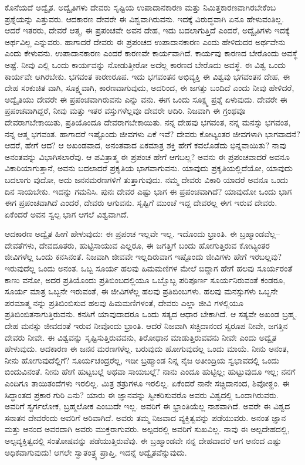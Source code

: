 ಕೊನೆಯದೆ ಅದ್ವೈತ. ಅದ್ವೈತಿಗಳು ದೇವರು ಸೃಷ್ಟಿಯ ಉಪಾದಾನಕಾರಣ ಮತ್ತು ನಿಮಿತ್ತಕಾರಣವಾಗಿರಬೇಕೆಂಬ ಪ್ರಶ್ನೆಯನ್ನು ಎತ್ತುವರು. ಆದಕಾರಣ ದೇವರೇ ಈ ವಿಶ್ವವಾಗಿರುವನು. ಇದಕ್ಕೆ ವಿರುದ್ಧವಾಗಿ ಏನೂ ಹೇಳುವಂತಿಲ್ಲ. ಆದರೆ ಇತರರು, ದೇವರೆ ಆತ್ಮ, ಈ ಪ್ರಪಂಚವೇ ಅವನ ದೇಹ, ಇದು ಬದಲಾಗುತ್ತಿದೆ ಎಂದರೆ, ಅದ್ವೈತಿಗಳು ಇದಕ್ಕೆ ಅರ್ಥವಿಲ್ಲ ಎನ್ನುವರು. ಹಾಗಾದರೆ ದೇವರು ಈ ಪ್ರಪಂಚದ ಉಪಾದಾನಕಾರಣ ಎಂದು ಹೇಳಿದುದರ ಅರ್ಥವೇನು ಎಂದು ಕೇಳುವನು. ಉಪಾದಾನಕಾರಣ ಎಂದರೆ ಕಾರಣವೇ ಕಾರ್ಯವಾಗಿದೆ. ಕಾರ್ಯವು ಕಾರಣದ ಬೇರೊಂದು ಅವಸ್ಥೆ ಅಷ್ಟೆ. ನೀವು ಎಲ್ಲಿ ಒಂದು ಕಾರ್ಯವನ್ನು ನೋಡುತ್ತೀರೋ ಅದೆಲ್ಲ ಕಾರಣದ ಬೇರೊದು ಅವಸ್ಥೆ. ಈ ವಿಶ್ವ ಒಂದು ಕಾರ್ಯವೇ ಆಗಿರಬೇಕು. ಭಗವಂತ ಕಾರಣರೂಪ. ಇದು ಭಗವಂತನ ಅಭಿವ್ಯಕ್ತಿ ಈ ವಿಶ್ವವು ಭಗವಂತನ ದೇಹ, ಈ ದೇಹ ಸಂಕುಚಿತ ವಾಗಿ, ಸೂಕ್ಷ್ಮವಾಗಿ, ಕಾರಣವಾಗುವುದು, ಅದರಿಂದ, ಈ ಜಗತ್ತು ಬಂದಿದೆ ಎಂದು ನೀವು ಹೇಳಿದರೆ, ಅದ್ವೈತಿಯು ದೇವರೇ ಈ ಪ್ರಪಂಚವಾಗಿರುವನು ಎನ್ನು ವನು. ಈಗ ಒಂದು ಸೂಕ್ಷ್ಮ ಪ್ರಶ್ನೆ ಏಳುವುದು. ದೇವರೇ ಈ ಪ್ರಪಂಚವಾಗಿದ್ದರೆ, ನೀವು ಮತ್ತು ಇತರ ವಸ್ತುಗಳೆಲ್ಲವೂ ದೇವರೇ ಆದಿರಿ. ನಿಜವಾಗಿ ಈ ಗ್ರಂಥವೂ ದೇವರಾಗಬೇಕಾಯಿತು, ಪ್ರತಿಯೊಂದೂ ದೇವರಾಗಬೇಕಾಯಿತು. ನನ್ನ ದೇಹವು ಭಗವಂತ, ನನ್ನ ಮನಸ್ಸು ಭಗವಂತ, ನನ್ನ ಆತ್ಮ ಭಗವಂತ. ಹಾಗಾದರೆ ಇಷ್ಟೊಂದು ಜೀವಗಳು ಏಕೆ ಇವೆ? ದೇವರು ಕೋಟ್ಯಂತರ ಜೀವಗಳಾಗಿ ಭಾಗವಾದನೆ? ಆದರೆ, ಹೇಗೆ ಆದ? ಆ ಅಖಂಡವಾದ, ಅನಂತವಾದ ಏಕಮಾತ್ರ ಶಕ್ತಿ ಹೇಗೆ ಕವಲೊಡೆದು ಭಿನ್ನವಾಯಿತು? ನಾವು ಅನಂತವನ್ನು ವಿಭಾಗಿಸಲಾರೆವು. ಆ ಪವಿತ್ರಾತ್ಮ ಈ ಪ್ರಪಂಚ ಹೇಗೆ ಆಗಬಲ್ಲ? ಅವನು ಈ ಪ್ರಪಂಚವಾದರೆ ಅವನೂ ವಿಕಾರಿಯಾಗುತ್ತಾನೆ, ಅವನು ಬದಲಾದರೆ ಪ್ರಕೃತಿಯ ಭಾಗವಾಗುವನು. ಯಾವುದು ಪ್ರಕೃತಿಯಲ್ಲಿದೆಯೋ, ಯಾವುದು ಬದಲಾಗು ವುದೋ, ಅದು ಜನನಮರಣಗಳಿಗೆ ತುತ್ತಾಗುವುದು. ನಮ್ಮ ದೇವರು ವಿಕಾರಿ ಯಾದರೆ ಅವನೂ ಒಂದು ದಿನ ಸಾಯಬೇಕು. ಇದನ್ನು ಗಮನಿಸಿ. ಪುನಃ ದೇವರ ಎಷ್ಟು ಭಾಗ ಈ ಪ್ರಪಂಚವಾಗಿದೆ? ಯಾವುದೋ ಒಂದು  ಭಾಗ ಈಗ ಪ್ರಪಂಚವಾಗಿದೆ ಎಂದರೆ, ದೇವರು  ಆಗುವನು. ಸೃಷ್ಟಿಗೆ ಮುಂಚೆ ಇದ್ದ ದೇವರಲ್ಲ ಈಗ ಇರುವ ದೇವರು. ಏಕೆಂದರೆ ಅವನ ಸ್ವಲ್ಪ ಭಾಗ ಆಗಲೆ ವಿಶ್ವವಾಗಿದೆ.

ಆದಕಾರಣ ಅದ್ವೈತ ಹೀಗೆ ಹೇಳುವುದು: ಈ ಪ್ರಪಂಚ ಇಲ್ಲವೇ ಇಲ್ಲ. ಇದೊಂದು ಭ್ರಾಂತಿ. ಈ ಬ್ರಹ್ಮಾಂಡವೆಲ್ಲ–ದೇವತೆಗಳು, ದೇವದೂತರು, ಹುಟ್ಟಿಸಾಯುವ ಎಲ್ಲರೂ, ಈ ಜಗತ್ತಿಗೆ ಬಂದು ಹೋಗುತ್ತಿರುವ ಕೋಟ್ಯಂತರ ಜೀವಿಗಳೆಲ್ಲ ಒಂದು ಕನಸಿನಂತೆ. ನಿಜವಾಗಿ ಜೀವವೇ ಇಲ್ಲದಿರುವಾಗ ಇಷ್ಟೊಂದು ಜೀವಿಗಳು ಹೇಗೆ ಇರಬಲ್ಲವು? ಇರುವುದೆಲ್ಲ ಒಂದು ಅನಂತ. ಒಬ್ಬ ಸೂರ್ಯ ಹಲವು ಹಿಮಮಣಿಗಳ ಮೇಲೆ ಬಿದ್ದಾಗ ಹೇಗೆ ಹಲವು ಸೂರ್ಯರಂತೆ ಕಾಣು ವನೋ, ಅದರ ಪ್ರತಿಯೊಂದು ಪ್ರತಿಬಿಂಬದಲ್ಲಿಯೂ ಒಬ್ಬೊಬ್ಬ ಪರಿಪೂರ್ಣ ಸೂರ್ಯನಿರುವಂತೆ ಕಂಡರೂ, ಸೂರ್ಯ ಮಾತ್ರ ಒಬ್ಬನೇ ಇರುವಂತೆ, ಈ ಜೀವಿಗಳೆಲ್ಲ ಹಲವು ಪ್ರತಿಬಿಂಬಗಳು. ಹಲವು ಮನಸ್ಸುಗಳು ಒಬ್ಬನೇ ಪರಮಾತ್ಮ ನನ್ನು ಪ್ರತಿಬಿಂಬಿಸುವ ಹಲವು ಹಿಮಮಣಿಗಳಂತೆ, ದೇವರು ಎಲ್ಲಾ ಜೀವಿ ಗಳಲ್ಲಿಯೂ ಪ್ರತಿಬಿಂಬಿತನಾಗುತ್ತಿರುವನು. ಕನಸಿಗೆ ಯಾವುದಾದರೂ ಒಂದು ಸತ್ಯದ ಆಧಾರ ಬೇಕಾಗಿದೆ. ಆ ಸತ್ಯವೇ ಅಖಂಡ ಬ್ರಹ್ಮ. ದೇಹ ಮನಸ್ಸು ಜೀವದಂತೆ ಇರುವ ನೀವೊಂದು ಭ್ರಾಂತಿ. ಆದರೆ ನಿಜವಾಗಿ ಸಚ್ಚಿದಾನಂದ ಸ್ವರೂಪ ನೀವೇ, ಜಗತ್ತಿನ ದೇವರು ನೀವೇ. ಈ ವಿಶ್ವವನ್ನು ಸೃಷ್ಟಿಸುತ್ತಿರುವವನು, ತಿರೋಧಾನ ಮಾಡುತ್ತಿರುವವನು ನೀವೇ ಎಂದು ಅದ್ವೈತ ಹೇಳುವುದು. ಆದಕಾರಣ ಈ ಜನನ ಮರಣಗಳೆಲ್ಲ. ಬರುವುದು ಹೋಗುವುದೆಲ್ಲ ಒಂದು ಮಾಯೆ. ನೀನು ಅನಂತ, ನೀನು ಹೋಗುವುದೆಲ್ಲಿಗೆ? ಸೂರ್ಯಚಂದ್ರರೆಲ್ಲ, ಇಡೀ ಬ್ರಹ್ಮಾಂಡ ನಿನ್ನ ನೈಜ ಅತೀಂದ್ರಿಯ ಸ್ವಭಾವದಲ್ಲಿ ಒಂದು ಬಿಂದುವಿನಂತೆ. ನೀನು ಹೇಗೆ ಹುಟ್ಟಬಲ್ಲೆ ಅಥವಾ ಸಾಯಬಲ್ಲೆ? ನಾನು ಎಂದೂ ಹುಟ್ಟಿಲ್ಲ; ಹುಟ್ಟುವುದೂ ಇಲ್ಲ; ನನಗೆ ಎಂದಿಗೂ ತಾಯಿತಂದೆಗಳು ಇರಲಿಲ್ಲ. ಮಿತ್ರ ಶತ್ರುಗಳೂ ಇರಲಿಲ್ಲ. ಏಕೆಂದರೆ ನಾನೇ ಸಚ್ಚಿದಾನಂದ, ಶಿವೋಠ್ಹಂ. ಈ ಸಿದ್ಧಾಂತದ ಪ್ರಕಾರ ಗುರಿ ಏನು? ಯಾರು ಈ ಜ್ಞಾನವನ್ನು ಸ್ವೀಕರಿಸುವರೊ ಅವರು ವಿಶ್ವದಲ್ಲಿ ಒಂದಾಗಿರುವರು. ಅವರಿಗೆ ಸ್ವರ್ಗಲೋಕ, ಬ್ರಹ್ಮಲೋಕ ಎಂಬುದೇ ಇಲ್ಲ. ಅವರಿಗೆ ಈ ಭ್ರಾಂತಿಯೆಲ್ಲ ನಾಶವಾಗಿದೆ. ಅವರೇ ಈ ವಿಶ್ವದ ಸನಾತನ ದೇವರೆಂದು ಅವರಿಗೆ ಅರಿವಾಗಿದೆ. ಅವರು ತಮ್ಮ ನಿಜವಾದ ವ್ಯಕ್ತಿತ್ವವನ್ನು ಪಡೆಯುವರು. ಅನಂತ ಜ್ಞಾನ ಮತ್ತು ಆನಂದ ಅವರದಾಗಿ ಅವರು ಮುಕ್ತರಾಗುವರು. ಅಲ್ಪದರಲ್ಲಿ ಅವರಿಗೆ ಸುಖವಿಲ್ಲ. ನಾವು ಈ ಅಲ್ಪದೇಹದಲ್ಲಿ, ಅಲ್ಪವ್ಯಕ್ತಿತ್ವದಲ್ಲಿ ಸಂತೋಷವನ್ನು ಪಡೆಯುತ್ತಿರುವೆವು. ಈ ಬ್ರಹ್ಮಾಂಡವೇ ನನ್ನ ದೇಹವಾದರೆ ಆಗ ಆನಂದ ಎಷ್ಟು ಅಧಿಕವಾಗುವುದು! ಆಗಲೇ ಸ್ವಾತಂತ್ರ್ಯ ಪ್ರಾಪ್ತಿ, ಇದನ್ನೆ ಅದ್ವೈತವೆನ್ನುವುದು.

